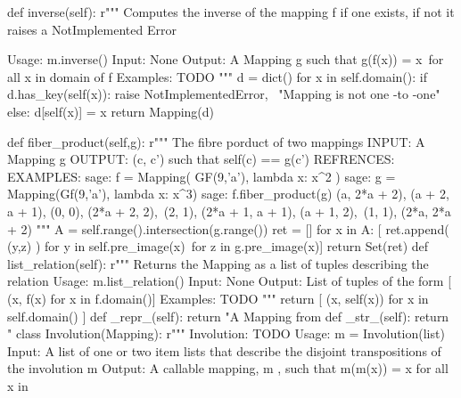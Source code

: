 \begin{sageblock}
        def inverse(self):
                r"""
                Computes the inverse of the mapping f if one exists, 
                if not it raises a NotImplemented Error
                
                Usage: m.inverse()
                Input: None
                Output: 
                A Mapping g such that g(f(x)) = x\
                for all x in domain of f
                Examples: TODO
                """
                d = dict()
                for x in self.domain():
                        if d.has_key(self(x)):
                                raise NotImplementedError, \
                                "Mapping is not one -to -one"
                        else:
                                d[self(x)] = x
                return Mapping(d)

        def fiber_product(self,g):
                r"""
                The fibre porduct of two mappings
                INPUT: A Mapping g
                OUTPUT: (c, c') such that self(c) == g(c')
                REFRENCES: 
                EXAMPLES:
                  sage: f = Mapping( GF(9,'a'), lambda x: x^2 ) 
                  sage: g = Mapping(Gf(9,'a'), lambda x: x^3)
                  sage: f.fiber_product(g)
                  {(a, 2*a + 2), (a + 2, a + 1), (0, 0), (2*a + 2, 2),\
                   (2, 1), (2*a + 1, a + 1), (a + 1, 2),\
                   (1, 1), (2*a, 2*a + 2)}
                """
                A = self.range().intersection(g.range())
                ret = []
                for x in A:
                        [ ret.append( (y,z) ) for 
                        y in self.pre_image(x)\ 
                        for z in g.pre_image(x)]
                return Set(ret)
        def list_relation(self):
                r"""
                Returns the Mapping as a list of 
                tuples describing the relation
                Usage: m.list_relation()
                Input: None
                Output: List of tuples of the form 
                [ (x, f(x) for x in f.domain()]
                Examples: TODO
                """
                return [ (x, self(x)) for x in self.domain() ]
        def _repr_(self):
                return "A Mapping from 
        def _str_(self):
                return "%
class Involution(Mapping):
    r"""
    Involution: TODO
    Usage: m = Involution(list)
    Input: A list of one or two item lists that describe the disjoint 
    transpositions of the involution m
    Output: A callable mapping, m , such that m(m(x)) = x for all x in 

\end{sageblock}
